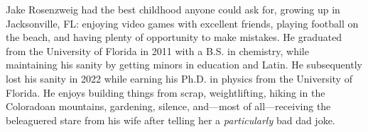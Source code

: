 

Jake Rosenzweig had the best childhood anyone could ask for, growing up in Jacksonville, FL: enjoying video games with excellent friends, playing football on the beach, and having plenty of opportunity to make mistakes.
He graduated from the University of Florida in 2011 with a B.S. in chemistry, while maintaining his sanity by getting minors in education and Latin.
He subsequently lost his sanity in 2022 while earning his Ph.D. in physics from the University of Florida.
He enjoys building things from scrap, weightlifting, hiking in the Coloradoan mountains, gardening, silence, and---most of all---receiving the beleaguered stare from his wife after telling her a \emph{particularly} bad dad joke.
